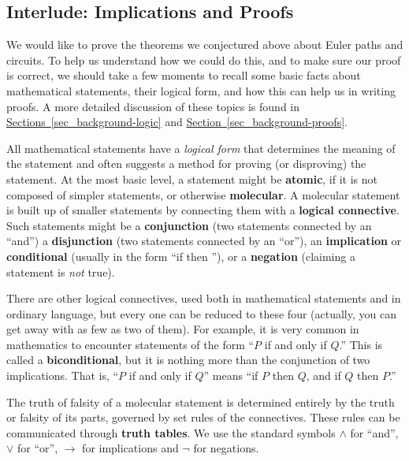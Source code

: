 \documentclass[10pt,]{book}
\newcommand{\terminology}[1]{\textbf{#1}}
\theoremstyle{plain}
\theoremstyle{definition}
\theoremstyle{definition}
\theoremstyle{definition}
\numberwithin{equation}{chapter}
\def\imp{\rightarrow}
\begin{document}
\subsection[{Interlude: Implications and Proofs}]{Interlude: Implications and Proofs}\label{subsection-34}
\hypertarget{p-1389}{}%
We would like to prove the theorems we conjectured above about Euler paths and circuits.  To help us understand how we could do this, and to make sure our proof is correct, we should take a few moments to recall some basic facts about mathematical statements, their logical form, and how this can help us in writing proofs.  A more detailed discussion of these topics is found in \hyperref[sec_background-logic]{Sections~\ref{sec_background-logic}} and \hyperref[sec_background-proofs]{Section~\ref{sec_background-proofs}}.%
\par
\hypertarget{p-1390}{}%
All mathematical statements have a \emph{logical form} that determines the meaning of the statement and often suggests a method for proving (or disproving) the statement.  At the most basic level, a statement might be \terminology{atomic}, if it is not composed of simpler statements, or otherwise \terminology{molecular}.  A molecular statement is built up of smaller statements by connecting them with a \terminology{logical connective}. Such statements might be a \terminology{conjunction} (two statements connected by an ``and'') a \terminology{disjunction} (two statements connected by an ``or''), an \terminology{implication} or \terminology{conditional} (usually in the form ``if \textellipsis{} then \textellipsis{}''), or a \terminology{negation} (claiming a statement is \emph{not} true).%
\par
\hypertarget{p-1391}{}%
There are other logical connectives, used both in mathematical statements and in ordinary language, but every one can be reduced to these four (actually, you can get away with as few as two of them).   For example, it is very common in mathematics to encounter statements of the form ``\(P\) if and only if \(Q\).''  This is called a \terminology{biconditional}, but it is nothing more than the conjunction of two implications.  That is, ``\(P\) if and only if \(Q\)'' means ``if \(P\) then \(Q\), and if \(Q\) then \(P\).''%
\par
\hypertarget{p-1392}{}%
The truth of falsity of a molecular statement is determined entirely by the truth or falsity of its parts, governed by set rules of the connectives.  These rules can be communicated through \terminology{truth tables}.  We use the standard symbols \(\wedge\) for ``and'', \(\vee\) for ``or'', \(\imp\) for implications and \(\neg\) for negations.%
\end{document}
